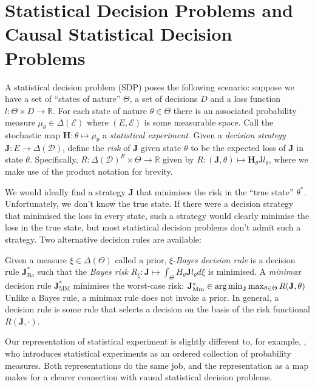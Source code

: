 
\section{Statistical Decision Problems and Causal Statistical Decision Problems}

A statistical decision problem (SDP) poses the following scenario: suppose we have a set of ``states of nature'' $\Theta$, a set of decisions $D$ and a loss function $l:\Theta\times D\to \mathbb{R}$. For each state of nature $\theta\in \Theta$ there is an associated probability measure $\mu_\theta\in \Delta(\mathcal{E})$ where $(E,\mathcal{E})$ is some measurable space. Call the stochastic map $\mathbf{H}:\theta\mapsto \mu_\theta$ a \emph{statistical experiment}. Given a \emph{decision strategy} $\mathbf{J}:E\to \Delta(\mathcal{D})$, define the \emph{risk} of $\mathbf{J}$ given state $\theta$ to be the expected loss of $\mathbf{J}$ in state $\theta$. Specifically, $R:\Delta(\mathcal{D})^E\times \Theta\to \mathbb{R}$ given by $R:(\mathbf{J},\theta)\mapsto \mathbf{H}_\theta \mathrm{J} l_\theta$, where we make use of the product notation for brevity.

We would ideally find a strategy $\mathbf{J}$ that minimises the risk in the ``true state'' $\theta^*$. Unfortunately, we don't know the true state. If there were a decision strategy that minimised the loss in every state, such a strategy would clearly minimise the loss in the true state, but most statistical decision problems don't admit such a strategy.  Two alternative decision rules are available:

Given a measure $\xi\in \Delta(\Theta)$ called a prior, $\xi$-\emph{Bayes decision rule} is a decision rule $\mathbf{J}^*_{\mathrm{Ba}}$ such that the \emph{Bayes risk} $R_\xi:\mathbf{J}\mapsto \int_\Theta H_\theta \mathbf{J} l_\theta d\xi$ is minimised. A \emph{minimax} decision rule $\mathbf{J}^*_{\mathrm{MM}}$ minimises the worst-case risk: $\mathbf{J}^*_{\mathrm{Mm}}\in \operatorname*{arg\,min}_{\mathbf{J}} \max_{\theta\in \Theta} R(\mathbf{J},\theta)$ Unlike a Bayes rule, a minimax rule does not invoke a prior. In general, a decision rule is some rule that selects a decision on the basis of the risk functional $R(\mathbf{J},\cdot)$.

Our representation of statistical experiment is slightly different to, for example, \citet{le_cam_comparison_1996}, who introduces statistical experiments as an ordered collection of probability measures. Both representations do the same job, and the representation as a map makes for a clearer connection with causal statistical decision problems. 

